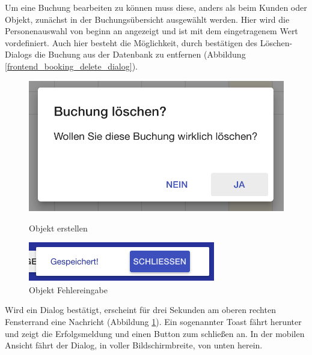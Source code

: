 Um eine Buchung bearbeiten zu können muss diese, anders als beim Kunden oder Objekt, zunächst in der Buchungsübersicht ausgewählt werden.
Hier wird die Personenauswahl von beginn an angezeigt und ist mit dem eingetragenem Wert vordefiniert. Auch hier besteht die Möglichkeit, durch bestätigen des Löschen-Dialogs die Buchung aus der Datenbank zu entfernen (Abbildung \ref{frontend_booking_delete_dialog}).

\begin{figure}[H]
    \centering
    \begin{minipage}[t]{0.49\linewidth}
        \centering
        \includegraphics[width=\linewidth]{images/frontend_booking_delete_dialog.png}
        \caption{Objekt erstellen}
        \label{frontend_booking_delete_dialog}
    \end{minipage}%
    \hfill
    \begin{minipage}[t]{0.49\linewidth}
        \centering
        \includegraphics[width=\linewidth]{images/frontend_toast.png}
        \caption{Objekt Fehlereingabe}
         \label{frontend_toast}
    \end{minipage}
\end{figure}

Wird ein Dialog bestätigt, erscheint für drei Sekunden am oberen rechten Fensterrand eine Nachricht (Abbildung \ref{frontend_toast}).
Ein sogenannter Toast fährt herunter und zeigt die Erfolgsmeldung und einen Button zum schließen an. In der mobilen Ansicht fährt der Dialog,
in voller Bildschirmbreite, von unten herein.

